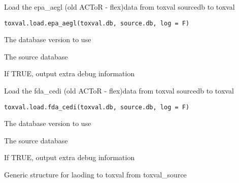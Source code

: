 \documentclass[letterpaper]{book}
\begin{document}
%
\begin{Description}\relax
Load the epa\_aegl (old ACToR - flex)data  from toxval sourcedb to toxval
\end{Description}
%
\begin{Usage}
\begin{verbatim}
toxval.load.epa_aegl(toxval.db, source.db, log = F)
\end{verbatim}
\end{Usage}
%
\begin{Arguments}
\begin{ldescription}
\item[\code{toxval.db}] The database version to use

\item[\code{source.db}] The source database

\item[\code{verbose}] If TRUE, output extra debug information
\end{ldescription}
\end{Arguments}
%
\begin{Description}\relax
Load the fda\_cedi (old ACToR - flex)data  from toxval sourcedb to toxval
\end{Description}
%
\begin{Usage}
\begin{verbatim}
toxval.load.fda_cedi(toxval.db, source.db, log = F)
\end{verbatim}
\end{Usage}
%
\begin{Arguments}
\begin{ldescription}
\item[\code{toxval.db}] The database version to use

\item[\code{source.db}] The source database

\item[\code{verbose}] If TRUE, output extra debug information
\end{ldescription}
\end{Arguments}
%
\begin{Description}\relax
Generic structure for laoding to toxval from toxval\_source
\end{Description}
\end{document}
